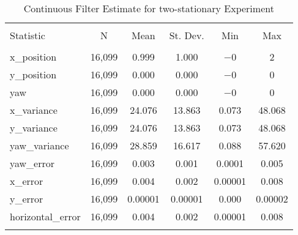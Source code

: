 
\begin{table}[h] \centering 
  \caption{Continuous Filter Estimate for two-stationary Experiment} 
  \label{tab:two_stationary_continuous_summary} 
\begin{tabular}{@{\extracolsep{5pt}}lccccc} 
\\[-1.8ex]\hline 
\hline \\[-1.8ex] 
Statistic & \multicolumn{1}{c}{N} & \multicolumn{1}{c}{Mean} & \multicolumn{1}{c}{St. Dev.} & \multicolumn{1}{c}{Min} & \multicolumn{1}{c}{Max} \\ 
\hline \\[-1.8ex] 
x\_position & 16,099 & 0.999 & 1.000 & $-$0 & 2 \\ 
y\_position & 16,099 & 0.000 & 0.000 & $-$0 & 0 \\ 
yaw & 16,099 & 0.000 & 0.000 & $-$0 & 0 \\ 
x\_variance & 16,099 & 24.076 & 13.863 & 0.073 & 48.068 \\ 
y\_variance & 16,099 & 24.076 & 13.863 & 0.073 & 48.068 \\ 
yaw\_variance & 16,099 & 28.859 & 16.617 & 0.088 & 57.620 \\ 
yaw\_error & 16,099 & 0.003 & 0.001 & 0.0001 & 0.005 \\ 
x\_error & 16,099 & 0.004 & 0.002 & 0.00001 & 0.008 \\ 
y\_error & 16,099 & 0.00001 & 0.00001 & 0.000 & 0.00002 \\ 
horizontal\_error & 16,099 & 0.004 & 0.002 & 0.00001 & 0.008 \\ 
\hline \\[-1.8ex] 
\end{tabular} 
\end{table} 
